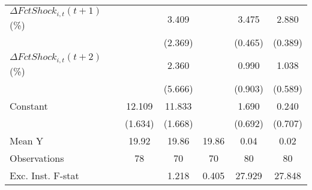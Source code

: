 {\begin{tabular}{l*{5}{c}}
\addlinespace
$ \Delta FctShock_{i,t}(t+1)$ (\%)&                     &       3.409         &                     &       3.475\sym{***}&       2.880\sym{***}\\
                    &                     &     (2.369)         &                     &     (0.465)         &     (0.389)         \\
\addlinespace
$ \Delta FctShock_{i,t}(t+2)$ (\%)&                     &       2.360         &                     &       0.990         &       1.038         \\
                    &                     &     (5.666)         &                     &     (0.903)         &     (0.589)         \\
\addlinespace
Constant            &      12.109\sym{***}&      11.833\sym{***}&                     &       1.690\sym{**} &       0.240         \\
                    &     (1.634)         &     (1.668)         &                     &     (0.692)         &     (0.707)         \\
\midrule
Mean Y              &       19.92         &       19.86         &       19.86         &        0.04         &        0.02         \\
Observations        &          78         &          70         &          70         &          80         &          80         \\
Exc. Inst. F-stat   &                     &       1.218         &       0.405         &      27.929         &      27.848         \\
\bottomrule
\end{tabular}
}
